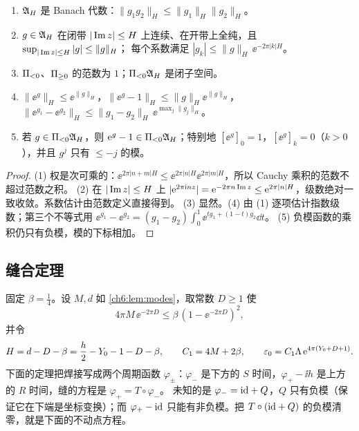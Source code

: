 \begin{lemma}\label{ch6:lem:wiener}
\begin{enumerate}
\item $\mathfrak A_H$ 是 Banach 代数：$\|g_1g_2\|_H\le\|g_1\|_H\|g_2\|_H$。
\item $g\in\mathfrak A_H$ 在闭带 $|\operatorname{Im} z|\le H$ 上连续、在开带上全纯，且 $\sup_{|\operatorname{Im} z|\le H}|g|\le\|g\|_H$；
 每个系数满足 $|g_k|\le\|g\|_H\,\ee^{-2\pi|k|H}$。
\item $\Pi_{<0}$、$\Pi_{\ge 0}$ 的范数为 $1$；$\Pi_{<0}\mathfrak A_H$ 是闭子空间。
\item $\|\ee^{g}\|_H\le\ee^{\|g\|_H}$，$\|\ee^{g}-1\|_H\le\|g\|_H\ee^{\|g\|_H}$，$\|\ee^{g_1}-\ee^{g_2}\|_H\le\|g_1-g_2\|_H\,\ee^{\max_j\|g_j\|_H}$。
\item 若 $g\in\Pi_{<0}\mathfrak A_H$，则 $\mathrm{e}^{g}-1\in\Pi_{<0}\mathfrak A_H$；特别地 $[\ee^g]_0=1$，$[\ee^g]_k=0$（$k>0$），并且 $g^j$ 只有 $\le-j$ 的模。
\end{enumerate}
\end{lemma}

\begin{proof}
(1) 权是次可乘的：$\ee^{2\pi|n+m|H}\le\ee^{2\pi|n|H}\ee^{2\pi|m|H}$，所以 Cauchy 乘积的范数不超过范数之积。
(2) 在 $|\operatorname{Im} z|\le H$ 上 $|\mathrm{e}^{2\pi\mathrm{i} nz}|=\mathrm{e}^{-2\pi n\operatorname{Im} z}\le\mathrm{e}^{2\pi|n|H}$，级数绝对一致收敛。系数估计由范数定义直接得到。
(3) 显然。(4) 由 (1) 逐项估计指数级数；第三个不等式用 $\ee^{g_1}-\ee^{g_2}=(g_1-g_2)\int_0^1\ee^{tg_1+(1-t)g_2}\dd t$。
(5) 负模函数的乘积仍只有负模，模的下标相加。
\end{proof}

\subsection{缝合定理}

固定 $\beta=\tfrac14$。设 $M,d$ 如 \cref{ch6:lem:modes}，取常数 $D\ge1$ 使
\begin{equation}\label{ch6:eq:Dchoice}
 4\pi M\,\ee^{-2\pi D}\le\beta\,(1-\ee^{-2\pi D})^2 ,
\end{equation}
并令
\[
 H=d-D-\beta=\frac h2-Y_0-1-D-\beta,\qquad C_1=4M+2\beta,\qquad \varepsilon_0=C_1\Lambda\,\mathrm{e}^{4\pi(Y_0+D+1)} .
\]
下面的定理把焊接写成两个周期函数 $\varphi_\pm$：$\varphi_-$ 是下方的 $S$ 时间，$\varphi_+-\ii h$ 是上方的 $R$ 时间，缝的方程是 $\varphi_+=T\circ\varphi_-$。
未知的是 $\varphi_-=\mathrm{id}+Q$，$Q$ 只有负模（保证它在下端是坐标变换）；而 $\varphi_+-\mathrm{id}$ 只能有非负模。把 $T\circ(\mathrm{id}+Q)$ 的负模清零，就是下面的不动点方程。

